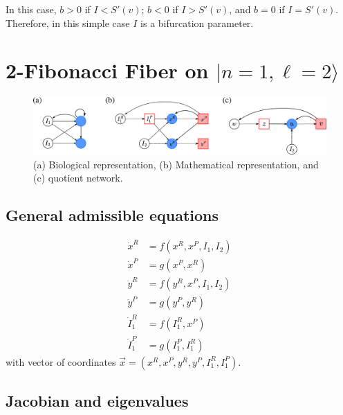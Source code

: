 \documentclass[12pt]{article}
\begin{document}
In this case, $b > 0$ if $I < S'(v)$; 
$b < 0$ if $I > S'(v)$, and $b = 0$ if
$I = S'(v)$. Therefore, in this simple case
$I$ is a bifurcation parameter.

\section{2-Fibonacci Fiber on $| n = 1, \ell = 2\rangle$}

\begin{figure}[H]
    \centering
    \includegraphics[scale=0.425]{figs/fibo2.png}
    \caption{(a) Biological representation, 
        (b) Mathematical representation, and (c) quotient
        network.}
    \label{fig:fig5}
\end{figure}

\subsection{General admissible equations}
\begin{equation} \label{eq:2fibo}
    \begin{aligned}
        \dot{x}^R &= f(x^R, x^P, I_1, I_2)\\
        \dot{x}^P &= g(x^P, x^R)\\
        \dot{y}^R &= f(y^R, x^P, I_1, I_2)\\
        \dot{y}^P &= g(y^P, y^R)\\
        \dot{I}_1^R &= f(I_1^R, x^P)\\
        \dot{I}_1^P &= g(I_1^P, I_1^R)
    \end{aligned}
\end{equation}
with vector of coordinates 
$\vec{x} = (x^R, x^P, y^R, y^P, I_1^R, I_1^P)$.

\subsection{Jacobian and eigenvalues}
\end{document}

